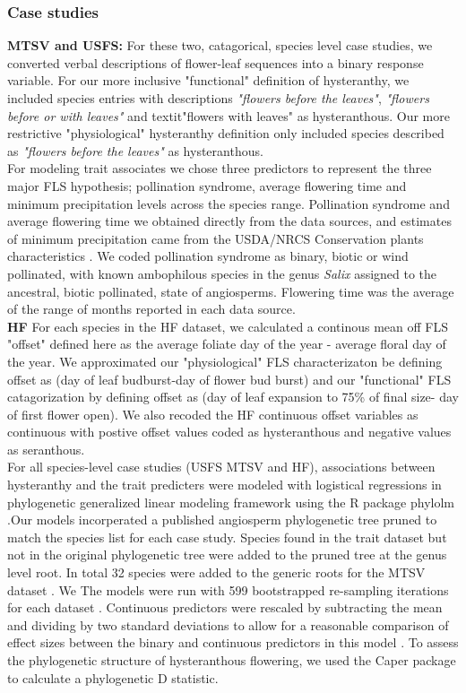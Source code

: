 \documentclass[12pt]{article}\usepackage[]{graphicx}\usepackage[]{color}
\begin{document}
\subsubsection*{Case studies}
\indent\indent \textbf{MTSV and USFS:} For these two, catagorical, species level case studies, we converted verbal descriptions of flower-leaf sequences into a binary response variable. For our more inclusive "functional" definition of hysteranthy, we included species entries with descriptions \textit{"flowers before the leaves"}, \textit{"flowers before or with leaves"} and textit{"flowers with leaves"} as hysteranthous. Our more restrictive "physiological" hysteranthy definition only included species described as \textit{"flowers before the leaves"} as hysteranthous.\\
\ident For modeling trait associates we chose three predictors to represent the three major FLS hypothesis; pollination syndrome, average flowering time and minimum precipitation levels across the species range. Pollination syndrome and average flowering time we obtained directly from the data sources, and estimates of minimum precipitation came from the USDA/NRCS Conservation plants characteristics \citep{}. We coded pollination syndrome as binary, biotic or wind pollinated, with known ambophilous species in the genus \textit{Salix} assigned to the ancestral, biotic pollinated, state of angiosperms. Flowering time was the average of the range of months reported in each data source.\\
\indent \textbf{HF} For each species in the HF dataset, we calculated a continous mean off FLS "offset" defined here as the average foliate day of the year - average floral day of the year. We approximated our "physiological" FLS characterizaton be defining offset as (day of leaf budburst-day of flower bud burst) and our "functional" FLS catagorization by defining offset as (day of leaf expansion to 75\% of final size- day of first flower open). We also recoded the HF continuous offset variables as continuous with postive offset values coded as hysteranthous and negative values as seranthous.\\
\indent For all species-level case studies (USFS MTSV and HF), associations between hysteranthy and the trait predicters were modeled with logistical regressions in phylogenetic generalized linear modeling framework \citep{Ives2010} using the R package phylolm \citep{Ho2014}.Our models incorperated a published angiosperm phylogenetic tree \citep{Zanne2013} pruned to match the species list for each case study. Species found in the trait dataset but not in the original phylogenetic tree were added to the pruned tree at the genus level root. In total 32 species were added to the generic roots for the MTSV dataset . We The models were run with 599 bootstrapped re-sampling iterations for each dataset \citep{Wilcox2000}. Continuous predictors were rescaled by subtracting the mean and dividing by two standard deviations to allow for a reasonable comparison of effect sizes between the binary and continuous predictors in this model \citep{Gelman2007}.  To assess the phylogenetic structure of hysteranthous flowering, we used the Caper package \citep{Orme2013} to calculate a phylogenetic D statistic.\\
\end{document}
